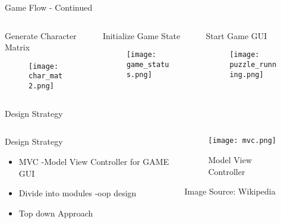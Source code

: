\documentclass[handout]{beamer}%
\begin{document}
\begin{frame}{Game Flow - Continued}
\begin{columns}[c]

\begin{column}{3cm}
\begin{tcolorbox}[colback=blue!5,colframe=blue!50!black,title=4]
\centering Generate Character Matrix
\end{tcolorbox}
\pause
\begin{figure}
\texttt{[image: char\_mat2.png]}
\end{figure}
\end{column}
\pause
\begin{column}[b]{4cm}
\begin{tcolorbox}[colback=blue!5,colframe=blue!50!black,title=5]
\centering Initialize Game State
\end{tcolorbox}
\pause
\begin{figure}
\texttt{[image: game\_status.png]}
\end{figure}
\end{column}
\pause
\begin{column}{3cm}
\begin{tcolorbox}[colback=blue!5,colframe=blue!50!black,title=6]
\centering Start Game GUI
\end{tcolorbox}
\pause
\begin{figure}
\texttt{[image: puzzle\_running.png]}
\end{figure}
\end{column}

\end{columns}
\end{frame}

\begin{frame}{Design Strategy}
\begin{columns}[c]
\begin{column}{5cm}
\begin{block}{Design Strategy}
\begin{itemize}
\item MVC -Model View  Controller for GAME GUI
\item Divide into modules -oop design
\item Top down Approach
\end{itemize}
\end{block}
\end{column}

\begin{column}{5cm}

\begin{figure}
\texttt{[image: mvc.png]}
\caption{Model View Controller}
\end{figure}
\small{Image Source: Wikipedia}
\end{column}
\end{columns}

\end{frame}
\end{document}
